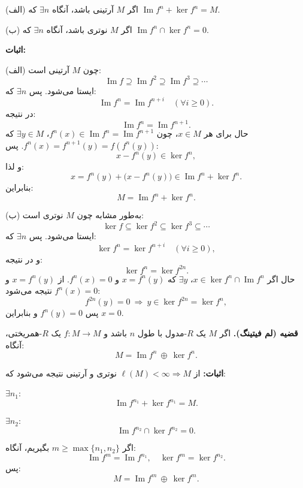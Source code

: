 (الف) اگر $M$ آرتینی باشد، آنگاه $\exists n$ که $\operatorname{Im} f^n + \ker f^n = M$.

(ب) اگر $M$ نوتری باشد، آنگاه $\exists n$ که $\operatorname{Im} f^n \cap \ker f^n = 0$.


\textbf{اثبات:}

(الف) چون $M$ آرتینی است:
\[
    \operatorname{Im} f \supseteq \operatorname{Im} f^2 \supseteq \operatorname{Im} f^3 \supseteq \cdots
\]
ایستا می‌شود. پس $\exists n$ که:
\[
    \operatorname{Im} f^n = \operatorname{Im} f^{n+i} \quad (\forall i \geq 0).
\]
در نتیجه:
\[
    \operatorname{Im} f^n = \operatorname{Im} f^{n+1}.
\]
حال برای هر $x \in M$، چون $f^n(x) \in \operatorname{Im} f^n = \operatorname{Im} f^{n+1}$،
$\exists y \in M$ که $f^n(x) = f^{n+1}(y) = f(f^n(y))$.
پس:
\[
    x - f^n(y) \in \ker f^n,
\]
و لذا:
\[
    x = f^n(y) + \big(x - f^n(y)\big) \in \operatorname{Im} f^n + \ker f^n.
\]
بنابراین:
\[
    M = \operatorname{Im} f^n + \ker f^n.
\]

(ب) به‌طور مشابه چون $M$ نوتری است:
\[
    \ker f \subseteq \ker f^2 \subseteq \ker f^3 \subseteq \cdots
\]
ایستا می‌شود. پس $\exists n$ که:
\[
    \ker f^n = \ker f^{n+i} \quad (\forall i \geq 0),
\]
و در نتیجه:
\[
    \ker f^n = \ker f^{2n}.
\]
حال اگر $x \in \ker f^n \cap \operatorname{Im} f^n$،
$\exists y$ که $x = f^n(y)$ و $f^n(x) = 0$.
از $x = f^n(y)$ و $f^n(x) = 0$ نتیجه می‌شود:
\[
    f^{2n}(y) = 0 \ \Rightarrow \ y \in \ker f^{2n} = \ker f^n,
\]
پس $f^n(y) = 0$ و بنابراین $x = 0$.


\textbf{قضیه (لم فیتینگ).}  
اگر $M$ یک $R$-مدول با طول $n$ باشد و $f : M \to M$ یک $R$-همریختی، آنگاه:
\[
M = \operatorname{Im} f^n \ \oplus \ \ker f^n.
\]

\textbf{اثبات:}  
از $\ell(M) < \infty \Rightarrow M$ نوتری و آرتینی نتیجه می‌شود که:  

$\exists n_1$:  
\[
\operatorname{Im} f^{n_1} + \ker f^{n_1} = M.
\]  

$\exists n_2$:  
\[
\operatorname{Im} f^{n_2} \cap \ker f^{n_2} = 0.
\]  

اگر $m \geq \max\{n_1, n_2\}$ بگیریم، آنگاه:
\[
\operatorname{Im} f^m = \operatorname{Im} f^{n_1}, \quad \ker f^m = \ker f^{n_2}.
\]
پس:
\[
M = \operatorname{Im} f^m \ \oplus \ \ker f^m.
\]
